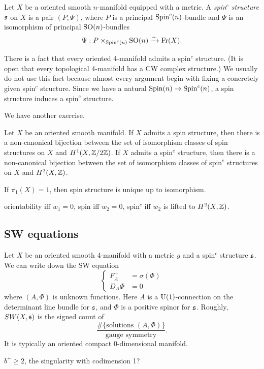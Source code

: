 \documentclass{../../../small}
\begin{document}
\begin{definition}
Let $X$ be a oriented smooth $n$-manifold equipped with a metric.
A \emph{spin$^c$ structure} $\mathfrak{s}$ on $X$ is a pair $(P,\Psi)$, where $P$ is a principal $\mathrm{Spin}^c(n)$-bundle and $\Psi$ is an isomorphism of principal $\mathrm{SO}(n)$-bundles
\[\Psi:P\times_{\mathrm{Spin}^c(n)}\mathrm{SO}(n)\xrightarrow{\sim}\mathrm{Fr}(X).\]
\end{definition}

There is a fact that every oriented 4-manifold admits a spin$^c$ structure.
(It is open that every topological 4-manifold has a CW complex structure.)
We usually do not use this fact because almost every argument begin with fixing a concretely given spin$^c$ structure.
Since we have a natural $\mathrm{Spin}(n)\to\mathrm{Spin}^c(n)$, a spin structure induces a spin$^c$ structure.


We have another exercise.
\begin{lemma}
Let $X$ be an oriented smooth manifold.
If $X$ admits a spin structure, then there is a non-canonical bijection between the set of isomorphism classes of spin structures on $X$ and $H^1(X,\mathbb{Z}/2\mathbb{Z})$.
If $X$ admits a spin$^c$ structure, then there is a non-canonical bijection between the set of isomorphism classes of spin$^c$ structures on $X$ and $H^2(X,\mathbb{Z})$.
\end{lemma}

If $\pi_1(X)=1$, then spin structure is unique up to isomorphism.

orientability iff $w_1=0$, spin iff $w_2=0$, spin$^c$ iff $w_2$ is lifted to $H^2(X,\mathbb{Z})$.

\subsection{SW equations}
Let $X$ be an oriented smooth 4-manifold with a metric $g$ and a spin$^c$ structure $\mathfrak{s}$.
We can write down the SW equation
\[\left\{\begin{alignedat}{1}
F_A^+&=\sigma(\Phi)\\
D_A\Phi&=0
\end{alignedat}\right.\]
where $(A,\Phi)$ is unknown functions.
Here $A$ is a $\mathrm{U}(1)$-connection on the determinant line bundle for $\mathfrak{s}$, and $\Phi$ is a positive spinor for $\mathfrak{s}$.
Roughly, $SW(X,\mathfrak{s})$ is the signed count of
\[\frac{\#\{\text{solutions $(A,\Phi)$}\}}{\text{gauge symmetry}}.\]
It is typically an oriented compact 0-dimensional manifold.

$b^+\ge2$, the singularity with codimension 1?
\end{document}
